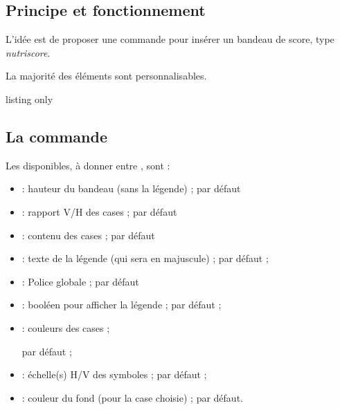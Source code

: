 \documentclass[french,11pt,a4paper]{article}
\begin{document}
\subsection{Principe et fonctionnement}

L'idée est de proposer une commande pour insérer un bandeau de score, type \textit{nutriscore}.

\smallskip

La majorité des éléments sont personnalisables.

\begin{DemoCode}{listing only}
\end{DemoCode}

\begin{DemoCode}{}
\BandeauScore{}
\end{DemoCode}

\subsection{La commande}

Les  disponibles, à donner entre \MontreCode{[...]}, sont :

\begin{itemize}
	\item {} : hauteur du bandeau (sans la légende) ;  par défaut
	\item {} : rapport V/H des cases ;  par défaut
	\item {} : contenu des cases ;  par défaut
	\item {} : texte de la légende (qui sera en majuscule) ;  par défaut ;
	\item {} : Police globale ;  par défaut
	\item {} : booléen pour afficher la légende ;   par défaut ;
	\item {} : couleurs des cases ;
	
	\hfill{} par défaut ;
	\item {} : échelle(s) H/V des symboles ;   par défaut ;
	\item {} : couleur du fond (pour la case choisie)  ;   par défaut.
\end{itemize}
\end{document}
